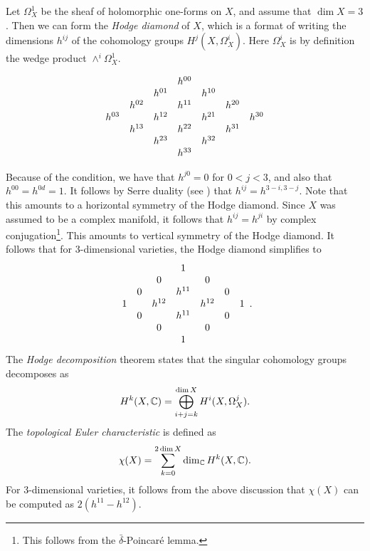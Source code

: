 Let $\Omega_X^1$ be the sheaf of holomorphic one-forms on $X$, and assume that $\dim X =3$. Then we can form the \emph{Hodge diamond} of $X$, which is a format of writing the dimensions $h^{ij}$ of the cohomology groups $H^j(X,\Omega_X^i)$. Here $\Omega_X^i$ is by definition the wedge product $\wedge^i \Omega_X^1$. 

\[
\begin{array}[c]{ccccccc}
&&& h^{00} \\  
 &         & h^{01} & & h^{10}  \\
&	h^{02} && h^{11}  && h^{20}  \\
h^{03} && h^{12} && h^{21} && h^{30} \\
&	h^{13} && h^{22}  && h^{31}  \\
 &         & h^{23} & & h^{32}  \\
 &&& h^{33} 
\end{array}
\]

Because of the \CY condition, we have that $h^{j0}=0$ for $0 < j < 3$, and also that $h^{00}=h^{0d}=1$. It follows by Serre duality (see \cite[Corollary 7.7, Chapter III]{hartshorne}) that $h^{ij}=h^{3-i,3-j}$. Note that this amounts to a horizontal symmetry of the Hodge diamond. Since $X$ was assumed to be a complex manifold, it follows that $h^{ij}=h^{ji}$ by complex conjugation\footnote{This follows from the $\bar \delta$-Poincaré lemma.}. This amounts to vertical symmetry of the Hodge diamond. It follows that for 3-dimensional \CY varieties, the Hodge diamond simplifies to
\[
\begin{array}[c]{ccccccc}
&&& 1 \\  
 &         & 0 & & 0  \\
&	0 && h^{11}  && 0  \\
1 && h^{12} && h^{12} && 1 \\
&	0 && h^{11}  && 0  \\
 &         & 0 & & 0  \\
 &&& 1 
\end{array}.
\]
The \emph{Hodge decomposition} theorem \cite[page 142]{voison_cg} states that the singular cohomology groups decomposes as
$$
H^k(X,\mathbb{C}) = \bigoplus_{i+j=k}^{\dim X} H^i(X,\Omega_X^j).
$$
The \emph{topological Euler characteristic} is defined as
$$
\chi(X) = \sum_{k=0}^{2 \dim X} \dim_{\mathbb{C}} H^k(X, \mathbb{C}).
$$
For 3-dimensional \CY varieties, it follows from the above discussion that $\chi(X)$ can be computed as $2(h^{11} - h^{12})$. 

